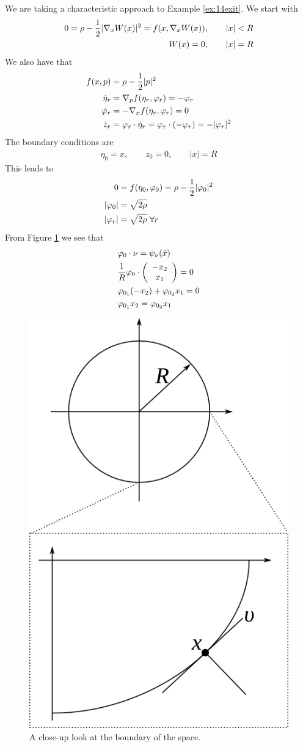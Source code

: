 \begin{example}
We are taking a characteristic approach to Example \ref{ex:14exit}. We start with
\begin{align*}
0 = \rho - \frac{1}{2}|\nabla_xW(x)|^2 = f(x,\nabla_xW(x))&, \qquad |x|<R \\
W(x) = 0&, \qquad |x| = R
\end{align*}
We also have that
\begin{align*}
f(x,p) &= \rho-\frac{1}{2}|p|^2 \\
\dot{\eta}_r &= \nabla_pf(\eta_r,\varphi_r) = -\varphi_r \\
\dot{\varphi}_r &= -\nabla_xf(\eta_r,\varphi_r) = 0 \\
\dot{z}_r &= \varphi_r\cdot\dot{\eta}_r = \varphi_r\cdot(-\varphi_r) = -|\varphi_r|^2
\end{align*}
The boundary conditions are
\begin{align*}
\eta_0 = x, \qquad z_0=0, \qquad |x|=R
\end{align*}
This leads to
\begin{align}
\label{eq:15vpr}
0 &= f(\eta_0,\varphi_0) = \rho-\frac{1}{2}|\varphi_0|^2 \nonumber \\
|\varphi_0| &= \sqrt{2\rho} \nonumber \\
|\varphi_r| &= \sqrt{2\rho} ~\forall r
\end{align}
From Figure \ref{fig:15circlezoom} we see that
\begin{align}
\label{eq:15vpo}
&\varphi_0\cdot\nu = \psi_\nu(\bar{x}) \nonumber \\
&\frac{1}{R}\varphi_0\cdot\left(\begin{array}{c} -x_2 \\ x_1 \end{array}\right) = 0 \nonumber \\
&\varphi_{0_1}(-x_2) + \varphi_{0_2}x_1 = 0 \nonumber \\
&\varphi_{0_1}x_2 = \varphi_{0_2}x_1
\end{align}

\begin{figure}[ht!]
	\centering
	\includegraphics[width=.4\textwidth]{images/15circlezoom}
	\caption{A close-up look at the boundary of the space.}
	\label{fig:15circlezoom}
\end{figure}


\end{example}
